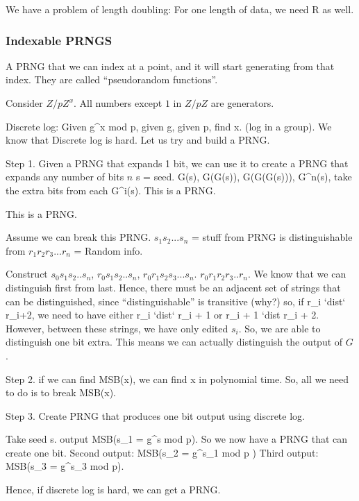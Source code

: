 We have a problem of length doubling: For one length of data, we need R as well.

\subsubsection{Indexable PRNGS}
A PRNG that we can index at a point, and it will start generating from that index. They are called ``pseudorandom functions''.

Consider $Z/pZ^x$. All numbers except $1$ in $Z/pZ$ are generators.

Discrete log: Given g^x mod p, given g, given p, find x. (log in a group). We know that Discrete log is hard. Let us try and build a PRNG.


Step 1. Given a PRNG that expands 1 bit, we can use it to create a PRNG that expands any number of bits $n$
s = seed. G(s), G(G(s)), G(G(G(s))), G^n(s), take the extra bits from each G^i(s). This is a PRNG.

This is a PRNG.

Assume we can break this PRNG. $s_1 s_2 ... s_n$ = stuff from PRNG is distinguishable from $r_1 r_2 r_3 ... r_n$ = Random info.

Construct $s_0 s_1 s_2 .. s_n$, $r_0 s_1 s_2.. s_n$, $r_0 r_1 s_2 s_3 ... s_n$. $r_0 r_1 r_2 r_3 .. r_n$. We know that we can
distinguish first from last. Hence, there must be an adjacent set of strings that can be distinguished, since ``distinguishable'' is transitive (why?)
so, if r_i `dist` r_{i+2}, we need to have either r_i `dist` r_{i + 1} or r_{i + 1} `dist r_{i + 2}. However, between these strings, we have only edited $s_i$.
So, we are able to distinguish one bit extra. This means we can actually distinguish the output of $G$.


Step 2. if we can find MSB(x), we can find x in polynomial time. So, all we need to do is to break MSB(x).


Step 3. Create PRNG that produces one bit output using discrete log.

Take seed s. output MSB(s_1 = g^s mod p). So we now have a PRNG that can create one bit. Second output: MSB(s_2 = g^{s_1} mod p )
Third output: MSB(s_3 = g^{s_3} mod p).

Hence, if discrete log is hard, we can get a PRNG. 
